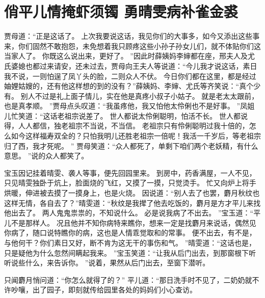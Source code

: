 \chapter{俏平儿情掩虾须镯 \quad 勇晴雯病补雀金裘}
\par
贾母道：“正是这话了。
上次我要说这话，我见你们的大事多，如今又添出这些事来，你们固然不敢抱怨，未免想着我只顾疼这些小孙子孙女儿们，就不体贴你们这当家人了。
你既这么说出来，更好了。
”因此时薛姨妈李婶都在座，邢夫人及尤氏婆媳也都过来请安，还未过去，贾母向王夫人等说道：“今儿我才说这话，素日我不说，一则怕逞了凤丫头的脸，二则众人不伏。
今日你们都在这里，都是经过妯娌姑嫂的，还有他这样想的到的没有？”薛姨妈、李婶、尤氏等齐笑说：“真个少有。
别人不过是礼上面子情儿，实在他是真疼小叔子小姑子。
就是老太太跟前，也是真孝顺。
”贾母点头叹道：“我虽疼他，我又怕他太伶俐也不是好事。
”凤姐儿忙笑道：“这话老祖宗说差了。
世人都说太伶俐聪明，怕活不长。
世人都说得，人人都信，独老祖宗不当说，不当信。
老祖宗只有伶俐聪明过我十倍的，怎么如今这样福寿双全的？只怕我明儿还胜老祖宗一倍呢！我活一千岁后，等老祖宗归了西，我才死呢。
”
贾母笑道：“众人都死了，单剩下咱们两个老妖精，有什么意思。
”说的众人都笑了。
\par
宝玉因记挂着晴雯、袭人等事，便先回园里来。
到房中，药香满屋，一人不见，只见晴雯独卧于炕上，脸面烧的飞红，又摸了一摸，只觉烫手。
忙又向炉上将手烘暖，伸进被去摸了一摸身上，也是火烧。
因说道：“别人去了也罢，麝月秋纹也这样无情，各自去了？”晴雯道：“秋纹是我撵了他去吃饭的，麝月是方才平儿来找他出去了。
两人鬼鬼祟祟的，不知说什么。
必是说我病了不出去。
”宝玉道：“平儿不是那样人。
况且他并不知你病特来瞧你，想来一定是找麝月来说话，偶然见你病了，随口说特瞧你的病，这也是人情乖觉取和的常事。
便不出去，有不是，与他何干？你们素日又好，断不肯为这无干的事伤和气。
”晴雯道：“这话也是，只是疑他为什么忽然间瞒起我来。
”宝玉笑道：“让我从后门出去，到那窗根下听听说些什么，来告诉你。
”说着，果然从后门出去，至窗下潜听。
\par
只闻麝月悄问道：“你怎么就得了的？”
平儿道：“那日洗手时不见了，二奶奶就不许吵嚷，出了园子，即刻就传给园里各处的妈妈们小心查访。
